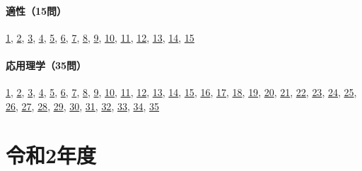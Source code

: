 \paragraph{適性（15問）} \hyperref[q:r01-ret-apt-01]{1}, \hyperref[q:r01-ret-apt-02]{2}, \hyperref[q:r01-ret-apt-03]{3}, \hyperref[q:r01-ret-apt-04]{4}, \hyperref[q:r01-ret-apt-05]{5}, \hyperref[q:r01-ret-apt-06]{6}, \hyperref[q:r01-ret-apt-07]{7}, \hyperref[q:r01-ret-apt-08]{8}, \hyperref[q:r01-ret-apt-09]{9}, \hyperref[q:r01-ret-apt-10]{10}, \hyperref[q:r01-ret-apt-11]{11}, \hyperref[q:r01-ret-apt-12]{12}, \hyperref[q:r01-ret-apt-13]{13}, \hyperref[q:r01-ret-apt-14]{14}, \hyperref[q:r01-ret-apt-15]{15}
\paragraph{応用理学（35問）} \hyperref[q:r01-ret-applied-01]{1}, \hyperref[q:r01-ret-applied-02]{2}, \hyperref[q:r01-ret-applied-03]{3}, \hyperref[q:r01-ret-applied-04]{4}, \hyperref[q:r01-ret-applied-05]{5}, \hyperref[q:r01-ret-applied-06]{6}, \hyperref[q:r01-ret-applied-07]{7}, \hyperref[q:r01-ret-applied-08]{8}, \hyperref[q:r01-ret-applied-09]{9}, \hyperref[q:r01-ret-applied-10]{10}, \hyperref[q:r01-ret-applied-11]{11}, \hyperref[q:r01-ret-applied-12]{12}, \hyperref[q:r01-ret-applied-13]{13}, \hyperref[q:r01-ret-applied-14]{14}, \hyperref[q:r01-ret-applied-15]{15}, \hyperref[q:r01-ret-applied-16]{16}, \hyperref[q:r01-ret-applied-17]{17}, \hyperref[q:r01-ret-applied-18]{18}, \hyperref[q:r01-ret-applied-19]{19}, \hyperref[q:r01-ret-applied-20]{20}, \hyperref[q:r01-ret-applied-21]{21}, \hyperref[q:r01-ret-applied-22]{22}, \hyperref[q:r01-ret-applied-23]{23}, \hyperref[q:r01-ret-applied-24]{24}, \hyperref[q:r01-ret-applied-25]{25}, \hyperref[q:r01-ret-applied-26]{26}, \hyperref[q:r01-ret-applied-27]{27}, \hyperref[q:r01-ret-applied-28]{28}, \hyperref[q:r01-ret-applied-29]{29}, \hyperref[q:r01-ret-applied-30]{30}, \hyperref[q:r01-ret-applied-31]{31}, \hyperref[q:r01-ret-applied-32]{32}, \hyperref[q:r01-ret-applied-33]{33}, \hyperref[q:r01-ret-applied-34]{34}, \hyperref[q:r01-ret-applied-35]{35}
\section{令和2年度}
